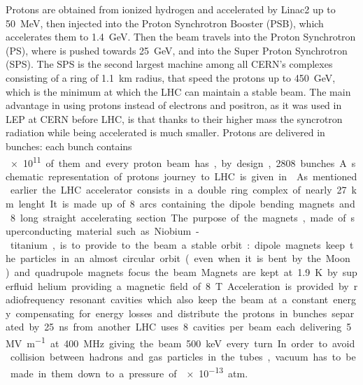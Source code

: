 Protons are obtained from ionized hydrogen and accelerated by Linac2 up to \SI{50}{\MeV}, then injected into the Proton Synchrotron Booster (PSB), which accelerates them to \SI{1.4}{\GeV}. Then the beam travels into the Proton Synchrotron (PS), where is pushed towards \SI{25}{\GeV}, and into the Super Proton Synchrotron (SPS). The SPS is the second largest machine among all CERN's complexes consisting of a ring of \SI{1.1}{\km} radius, that speed the protons up to \SI{450}{\GeV}, which is the minimum at which the LHC can maintain a stable beam. The main advantage in using protons instead of electrons and positron, as it was used in LEP at CERN before LHC, is that thanks to their higher mass the syncrotron radiation while being accelerated is much smaller. Protons are delivered in bunches: each bunch contains \SI{e11} of them and every proton beam has, by design, 2808 bunches. A schematic representation of protons journey to LHC is given in \Fig{\ref{fig:accelerators}}.

As mentioned earlier the LHC accelerator consists in a double ring complex of nearly \SI{27}{\km} lenght. It is made up of 8 arcs containing the dipole bending magnets and 8 long straight accelerating section. The purpose of the magnets, made of superconducting material such as Niobium-titanium, is to provide to the beam a stable orbit: dipole magnets keep the particles in an almost circular orbit (even when it is bent by the Moon) and quadrupole magnets focus the beam. Magnets are kept at \SI{1.9}{\K} by superfluid helium providing a magnetic field of \SI{8}{\tesla}. Acceleration is provided by radiofrequency resonant cavities which also keep the beam at a constant energy compensating for \mbox{energy} losses and distribute the protons in bunches separated by \SI{25}{\ns} from another. LHC uses 8 cavities per beam each delivering \SI{5}{MV\per\m} at \SI{400}{\MHz} giving the beam \SI{500}{\keV} every turn.
In order to avoid collision between hadrons and gas particles in the tubes, vacuum has to be made in them down to a pressure of \SI{e-13}{atm}.

